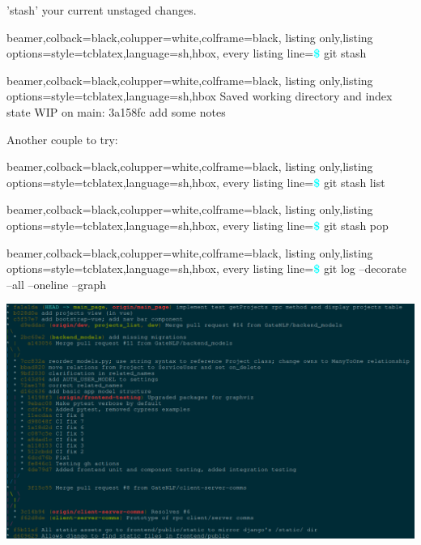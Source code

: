 \documentclass{beamer} %
\begin{document}
  \begin{frame}[fragile]
    'stash' your current unstaged changes.\newline
    \begin{tcblisting}{beamer,colback=black,colupper=white,colframe=black,
      listing only,listing options={style=tcblatex,language=sh},hbox,
      every listing line={\textcolor{cyan}{\small\ttfamily\bfseries\$}}}
      git stash
    \end{tcblisting}
    
    \begin{tcblisting}{beamer,colback=black,colupper=white,colframe=black,
      listing only,listing options={style=tcblatex,language=sh},hbox}
      Saved working directory and index state WIP on main: 3a158fc add some notes
    \end{tcblisting}

    Another couple to try:
    \begin{tcblisting}{beamer,colback=black,colupper=white,colframe=black,
      listing only,listing options={style=tcblatex,language=sh},hbox,
      every listing line={\textcolor{cyan}{\small\ttfamily\bfseries\$}}}
      git stash list
    \end{tcblisting}

    \begin{tcblisting}{beamer,colback=black,colupper=white,colframe=black,
      listing only,listing options={style=tcblatex,language=sh},hbox,
      every listing line={\textcolor{cyan}{\small\ttfamily\bfseries\$}}}
      git stash pop
    \end{tcblisting}
    
  \end{frame}

  \begin{frame}[fragile]
    \begin{tcblisting}{beamer,colback=black,colupper=white,colframe=black,
      listing only,listing options={style=tcblatex,language=sh},hbox,
      every listing line={\textcolor{cyan}{\small\ttfamily\bfseries\$}}}
    git log --decorate --all --oneline --graph
    \end{tcblisting}
    \includegraphics[height=.9\textheight]{git_log_tree_output.png}
  \end{frame}
\end{document}
